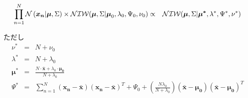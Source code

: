 \documentclass[a4j]{jarticle}
\begin{document}
\begin{screen}
\begin{eqnarray}
\prod_{n=1}^{N}{\operatorname{\mathcal{N}}{(\boldsymbol{x_n} | \boldsymbol{\mu}, \Sigma)}} \times \operatorname{\mathcal{NIW}}(\boldsymbol{\mu}, \Sigma | \boldsymbol{\mu}_0, \lambda_0, \Psi_0, \nu_0)
&\propto& 
\operatorname{\mathcal{NIW}}(\boldsymbol{\mu}, \Sigma | \boldsymbol{\mu^*}, \lambda^*, \Psi^*, \nu^*)
\end{eqnarray}

ただし
\begin{eqnarray}
\nu^*
&=&
N + \nu_0\\
\lambda^* 
&=&
N + \lambda_0\\
\boldsymbol{\mu^*}
&=&
\frac{N \cdot \boldsymbol{\bar{x}} + \lambda_0  \cdot \boldsymbol{\mu_0}}{N + \lambda_0}\\
\Psi^*
&=&
\sum_{n=1}^{N}{(\boldsymbol{x_n} - \boldsymbol{\bar{x}}) (\boldsymbol{x_n} - \boldsymbol{\bar{x}})^T} + \Psi_0 + \left( \frac{N \lambda_0}{N + \lambda_0} \right) \left( \boldsymbol{\bar{x}} - \boldsymbol{\mu_0} \right) \left( \boldsymbol{\bar{x}} - \boldsymbol{\mu_0} \right)^T
\end{eqnarray}
\end{screen}
\end{document}
